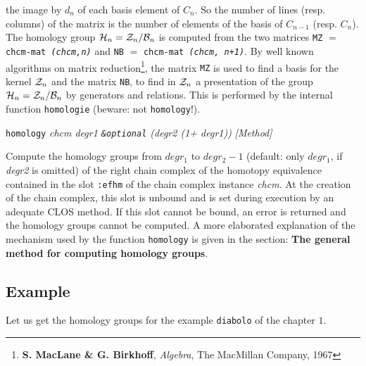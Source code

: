 {{the image by $d_n$ of each basis element of $C_n$. So the number of lines (resp. columns) of the matrix is
the number of elements of the basis of $C_{n-1}$ (resp. $C_n$).
The homology group
${\cal H}_n={\cal Z}_n/{\cal B}_n$ is computed from the two matrices
{\tt MZ} $=$ {\tt chcm-mat {\em (chcm,n)}} and
{\tt NB} $=$ {\tt chcm-mat {\em (chcm, n+1)}}. By well known algorithms
on matrix reduction\footnote{{\bf S. MacLane \& G. Birkhoff}, {\em Algebra},
The MacMillan Company, 1967}, the matrix {\tt MZ}  is used
to find a basis for the kernel ${\cal Z}_n$ and the matrix {\tt NB}, to find in ${\cal Z}_n$ a presentation
of the group ${\cal H}_n={\cal Z}_n/{\cal B}_n$ by generators and relations. This is performed
by the internal function {\tt homologie} (beware: not {\tt homology}!).\par}
{\leftskip=5mm
{\tt homology} {\em chcm  degr1 {\tt \&optional} (degr2 (1+ degr1))} \hfill {\em [Method]} \par}
{\leftskip=15mm
Compute the homology groups from $degr_1$ to $degr_2-1$ (default: only $degr_1$, if {\em degr2} is omitted) of
the right chain complex of the homotopy equivalence contained in the slot {\tt :efhm} of the
chain complex instance {\em chcm}. At the creation of the chain complex, this slot is unbound and
is set during execution by an adequate CLOS method. If this slot cannot be  bound, an error is returned and
the homology groups cannot be computed. A more elaborated explanation of the mechanism used by the function
{\tt homology} is given in the  section: {\bf The general method for computing homology groups}. \par}
}

\subsection* {Example}

Let us get the homology groups for the example {\tt diabolo} of the chapter $1$.


